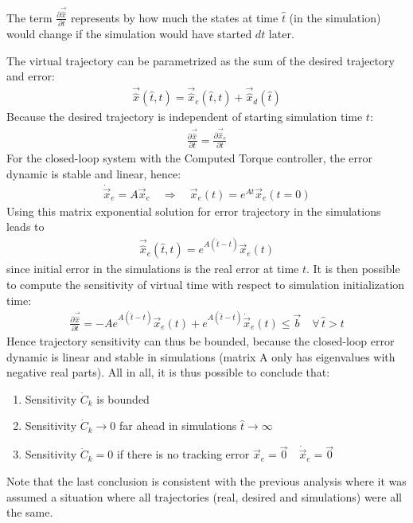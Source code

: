 The term $\frac{\partial \vec{\hat{x}}}{\partial t}$ represents by how much the states at time $\hat{t}$ (in the simulation) would change if the simulation would have started $dt$ later. 



The virtual trajectory can be parametrized as the sum of the desired trajectory and error:
%
\begin{align}
\vec{\hat{x}}( \hat{t} , t ) =  \vec{\hat{x}}_e( \hat{t} , t ) + \vec{\hat{x}}_d( \hat{t} )
\end{align}
%
Because the desired trajectory is independent of starting simulation time $t$:
%
\begin{align}
\frac{\partial \vec{\hat{x}}}{\partial t}  = \frac{\partial \vec{\hat{x}}_e}{\partial t}
\end{align}
%
%
For the closed-loop system with the Computed Torque controller, the error dynamic is stable and linear, hence:
%
\begin{align}
\dot{\vec{x}}_e = A \vec{x}_e  \quad \Rightarrow \quad  \vec{x}_e( t ) = e^{A t} \vec{x}_e(t=0)
\end{align}
%
Using this matrix exponential solution for error trajectory in the simulations leads to 
%
\begin{align}
\vec{\hat{x}}_e( \hat{t} , t ) = e^{A (\hat{t} - t )} \vec{x}_e(t)  
\end{align}
%
since initial error in the simulations is the real error at time $t$. It is then possible to compute the sensitivity of virtual time with respect to simulation initialization time:
%
\begin{align}
\frac{\partial \vec{\hat{x}}}{\partial t}  = -A e^{A (\hat{t} - t )} \vec{x}_e(t) + e^{A (\hat{t} - t )} \dot{\vec{x}}_e(t) \leq \vec{b} \quad \forall \, \hat{t} > t
\end{align}
%
Hence trajectory sensitivity can thus be bounded, because the closed-loop error dynamic is linear and stable in simulations (matrix A only has eigenvalues with negative real parts).  All in all, it is thus possible to conclude that:
\begin{enumerate}
	\item Sensitivity $\dot{C}_k$ is bounded
	\item Sensitivity $\dot{C}_k \rightarrow 0$ far ahead in simulations $\hat{t} \rightarrow \infty$
	\item Sensitivity $\dot{C}_k = 0$ if there is no tracking error $ \vec{x}_e = \vec{0} \quad \dot{\vec{x}}_e = \vec{0}$
\end{enumerate}

Note that the last conclusion is consistent with the previous analysis where it was assumed a situation where all trajectories (real, desired and simulations) were all the same.



